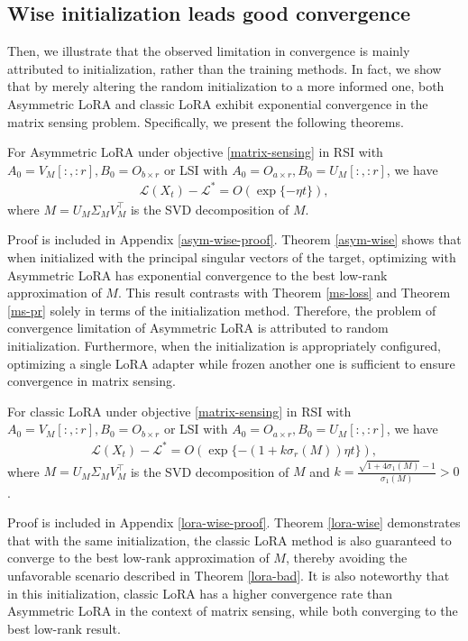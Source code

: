 \subsection{Wise initialization leads good convergence}
\label{theory-observation}
Then, we illustrate that the observed limitation in convergence is mainly attributed to initialization, rather than the training methods. In fact, we show that by merely altering the random initialization to a more informed one, both Asymmetric LoRA and classic LoRA exhibit exponential convergence in the matrix sensing problem. Specifically, we present the following theorems. 
\begin{theorem}
    \label{asym-wise}
    For Asymmetric LoRA under objective \ref{matrix-sensing} in RSI with $A_0=V_M[:,:r],B_0=O_{b\times r}$ or LSI with $A_0=O_{a\times r},B_0=U_M[:,:r]$, we have
    \begin{align*}
        \mathcal{L}(X_t)-\mathcal{L}^*=O(\exp\{-\eta t\}),
    \end{align*}
    where $M=U_M\Sigma_MV_M^\top$ is the SVD decomposition of $M$. 
\end{theorem}
Proof is included in Appendix \ref{asym-wise-proof}. 
Theorem \ref{asym-wise} shows that when initialized with the principal singular vectors of the target, optimizing with Asymmetric LoRA has exponential convergence to the best low-rank approximation of $M$. This result contrasts with Theorem \ref{ms-loss} and Theorem \ref{ms-pr} solely in terms of the initialization method. Therefore, the problem of convergence limitation of Asymmetric LoRA is attributed to random initialization. Furthermore, when the initialization is appropriately configured, optimizing a single LoRA adapter while frozen another one is sufficient to ensure convergence in matrix sensing.
\begin{theorem}
    \label{lora-wise}
    For classic LoRA under objective \ref{matrix-sensing} in RSI with $A_0=V_M[:,:r],B_0=O_{b\times r}$ or LSI with $A_0=O_{a\times r},B_0=U_M[:,:r]$, we have
    \begin{align*}
        \mathcal{L}(X_t)-\mathcal{L}^*=O(\exp\{-(1+k\sigma_r(M))\eta t\}),
    \end{align*}
    where $M=U_M\Sigma_MV_M^\top$ is the SVD decomposition of $M$ and $k=\frac{\sqrt{1+4\sigma_1(M)}-1}{\sigma_1(M)}>0$.
\end{theorem}
Proof is included in Appendix \ref{lora-wise-proof}. 
Theorem \ref{lora-wise} demonstrates that with the same initialization, the classic LoRA method is also guaranteed to converge to the best low-rank approximation of $M$, thereby avoiding the unfavorable scenario described in Theorem \ref{lora-bad}. It is also noteworthy that in this initialization, classic LoRA has a higher convergence rate than Asymmetric LoRA in the context of matrix sensing, while both converging to the best low-rank result.

